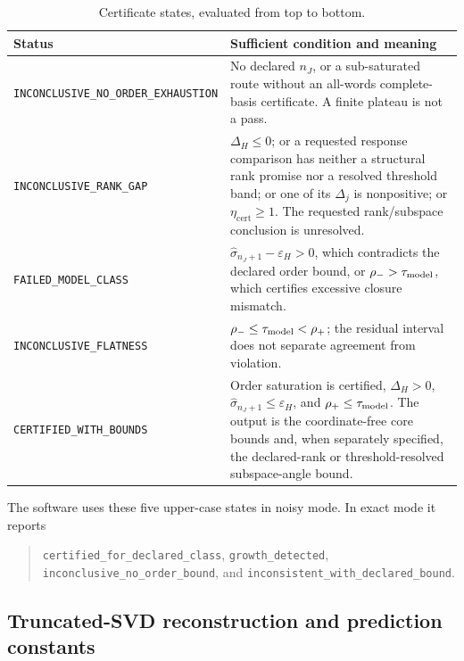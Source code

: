 \documentclass[aps,prl,onecolumn,superscriptaddress,nofootinbib]{revtex4-2}
\newcommand{\cert}{\mathrm{cert}}
\newcommand{\eps}{\varepsilon}
\begin{document}
\begin{table}[t]
\caption{Certificate states, evaluated from top to bottom.}
\label{tab:status}
\begin{tabular}{@{}ll@{}}
\toprule
\parbox[t]{0.29\linewidth}{Status} &
\parbox[t]{0.63\linewidth}{Sufficient condition and meaning}\\
\midrule
\parbox[t]{0.29\linewidth}{\texttt{INCONCLUSIVE\_NO\_ORDER\_EXHAUSTION}} &
\parbox[t]{0.63\linewidth}{No declared $n_J$, or a sub-saturated route without an all-words complete-basis certificate.  A finite plateau is not a pass.}\\[3pt]
\parbox[t]{0.29\linewidth}{\texttt{INCONCLUSIVE\_RANK\_GAP}} &
\parbox[t]{0.63\linewidth}{$\Delta_H\le0$; or a requested response comparison has neither a structural rank promise nor a resolved threshold band; or one of its $\Delta_j$ is nonpositive; or $\eta_{\cert}\ge1$.  The requested rank/subspace conclusion is unresolved.}\\[3pt]
\parbox[t]{0.29\linewidth}{\texttt{FAILED\_MODEL\_CLASS}} &
\parbox[t]{0.63\linewidth}{$\widehat\sigma_{n_J+1}-\eps_H>0$, which contradicts the declared order bound, or $\rho_->\tau_{\rm model}$, which certifies excessive closure mismatch.}\\[3pt]
\parbox[t]{0.29\linewidth}{\texttt{INCONCLUSIVE\_FLATNESS}} &
\parbox[t]{0.63\linewidth}{$\rho_-\le\tau_{\rm model}<\rho_+$; the residual interval does not separate agreement from violation.}\\[3pt]
\parbox[t]{0.29\linewidth}{\texttt{CERTIFIED\_WITH\_BOUNDS}} &
\parbox[t]{0.63\linewidth}{Order saturation is certified, $\Delta_H>0$, $\widehat\sigma_{n_J+1}\le\eps_H$, and $\rho_+\le\tau_{\rm model}$.  The output is the coordinate-free core bounds and, when separately specified, the declared-rank or threshold-resolved subspace-angle bound.}\\
\bottomrule
\end{tabular}
\end{table}

The software uses these five upper-case states in noisy mode.  In exact mode it reports
\begin{quote}\small\raggedright
\texttt{certified\_for\_declared\_class},
\texttt{growth\_detected},
\texttt{inconclusive\_no\_order\_bound}, and
\texttt{inconsistent\_with\_declared\_bound}.
\end{quote}

\subsection{Truncated-SVD reconstruction and prediction constants}
\label{sec:truncated-reconstruction}
\end{document}
